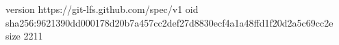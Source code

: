version https://git-lfs.github.com/spec/v1
oid sha256:9621390dd000178d20b7a457cc2def27d8830ecf4a1a48ffd1f20d2a5c69cc2e
size 2211
